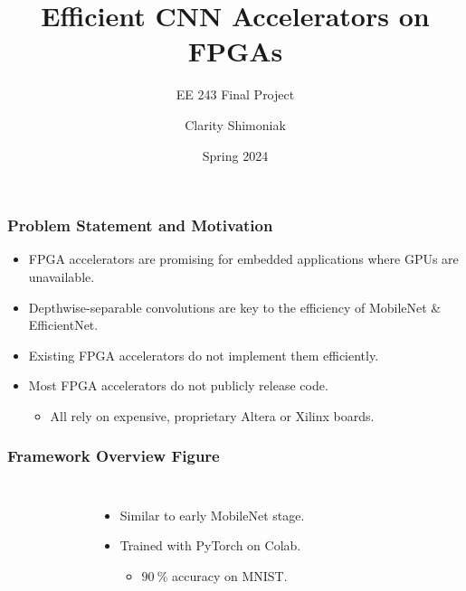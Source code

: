 \documentclass[english]{beamer}
\begin{document}
\title{Efficient CNN Accelerators on FPGAs}
\subtitle{EE 243 Final Project}
\author{Clarity Shimoniak}
\date{Spring 2024}
\frame{\titlepage}


\begin{frame}
\frametitle{Problem Statement and Motivation}
\begin{itemize}
	\item FPGA accelerators are promising for embedded applications where GPUs
	are unavailable.
	\item Depthwise-separable convolutions are key to the efficiency of
	MobileNet \& EfficientNet.
	\item Existing FPGA accelerators do not implement them efficiently.
	\item Most FPGA accelerators do not publicly release code.
	\begin{itemize}
		\item All rely on expensive, proprietary Altera or Xilinx boards.
	\end{itemize}
\end{itemize}
\end{frame}


\begin{frame}
\frametitle{Framework Overview Figure}
	\begin{columns}
		\begin{figure}
			\centering
		\end{figure}
		\begin{itemize}
			\item Similar to early MobileNet stage.
			\item Trained with PyTorch on Colab.
			\begin{itemize}
				\item $\SI{90}{\percent}$ accuracy on MNIST.
			\end{itemize}
		\end{itemize}
	\end{columns}
\end{frame}
\end{document}
